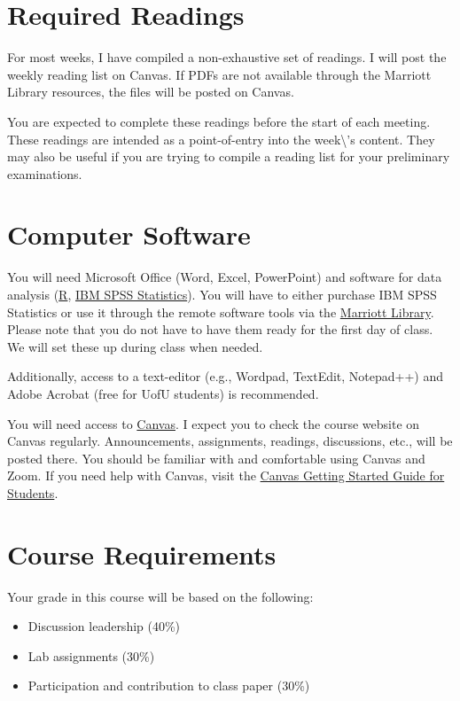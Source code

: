 \documentclass[
  letterpaper,
  DIV=11,
  numbers=noendperiod]{scrartcl}
\begin{document}
\hypertarget{required-readings}{%
\section{Required Readings}\label{required-readings}}

For most weeks, I have compiled a non-exhaustive set of readings. I will
post the weekly reading list on Canvas. If PDFs are not available
through the Marriott Library resources, the files will be posted on
Canvas.

You are expected to complete these readings before the start of each
meeting. These readings are intended as a point-of-entry into the
week\textbackslash's content. They may also be useful if you are trying
to compile a reading list for your preliminary examinations.

\hypertarget{computer-software}{%
\section{Computer Software}\label{computer-software}}

You will need Microsoft Office (Word, Excel, PowerPoint) and software
for data analysis (\href{https://www.r-project.org/}{R},
\href{https://onthehub.com/products/a4db50af-41be-eb11-813b-000d3af41938}{IBM
SPSS Statistics}). You will have to either purchase IBM SPSS Statistics
or use it through the remote software tools via the
\href{https://lib.utah.edu/services/knowledge-commons/remote-software/}{Marriott
Library}. Please note that you do not have to have them ready for the
first day of class. We will set these up during class when needed.

Additionally, access to a text-editor (e.g., Wordpad, TextEdit,
Notepad++) and Adobe Acrobat (free for UofU students) is recommended.

You will need access to \href{https://utah.instructure.com/}{Canvas}. I
expect you to check the course website on Canvas regularly.
Announcements, assignments, readings, discussions, etc., will be posted
there. You should be familiar with and comfortable using Canvas and
Zoom. If you need help with Canvas, visit the
\href{https://community.canvaslms.com/docs/DOC-10701}{Canvas Getting
Started Guide for Students}.

\hypertarget{course-requirements}{%
\section{Course Requirements}\label{course-requirements}}

Your grade in this course will be based on the following:

\begin{itemize}
\item
  Discussion leadership (40\%)
\item
  Lab assignments (30\%)
\item
  Participation and contribution to class paper (30\%)
\end{itemize}
\end{document}

